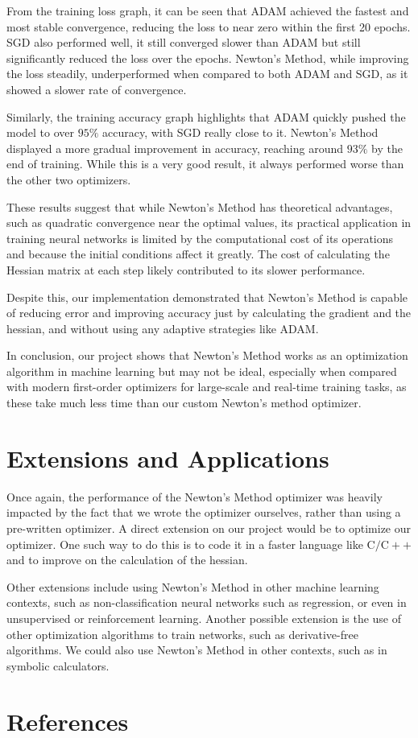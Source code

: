 \documentclass[10pt]{article}
\begin{document}
From the training loss graph, it can be seen that ADAM achieved the fastest and most stable convergence, reducing the loss to near zero within the first 20 epochs. SGD also performed well, it still converged slower than ADAM but still significantly reduced the loss over the epochs. Newton's Method, while improving the loss steadily, underperformed when compared to both ADAM and SGD, as it showed a slower rate of convergence.

Similarly, the training accuracy graph highlights that ADAM quickly pushed the model to over $95 \%$ accuracy, with SGD really close to it. Newton's Method displayed a more gradual improvement in accuracy, reaching around $93 \%$ by the end of training. While this is a very good result, it always performed worse than the other two optimizers.

These results suggest that while Newton's Method has theoretical advantages, such as quadratic convergence near the optimal values, its practical application in training neural networks is limited by the computational cost of its operations and because the initial conditions affect it greatly. The cost of calculating the Hessian matrix at each step likely contributed to its slower performance.

Despite this, our implementation demonstrated that Newton's Method is capable of reducing error and improving accuracy just by calculating the gradient and the hessian, and without using any adaptive strategies like ADAM.

In conclusion, our project shows that Newton's Method works as an optimization algorithm in machine learning but may not be ideal, especially when compared with modern first-order optimizers for large-scale and real-time training tasks, as these take much less time than our custom Newton's method optimizer.

\section*{Extensions and Applications}
Once again, the performance of the Newton's Method optimizer was heavily impacted by the fact that we wrote the optimizer ourselves, rather than using a pre-written optimizer. A direct extension on our project would be to optimize our optimizer. One such way to do this is to code it in a faster language like $\mathrm{C} / \mathrm{C}++$ and to improve on the calculation of the hessian.

Other extensions include using Newton's Method in other machine learning contexts, such as non-classification neural networks such as regression, or even in unsupervised or reinforcement learning. Another possible extension is the use of other optimization algorithms to train networks, such as derivative-free algorithms. We could also use Newton's Method in other contexts, such as in symbolic calculators.

\section*{References}
\end{document}
